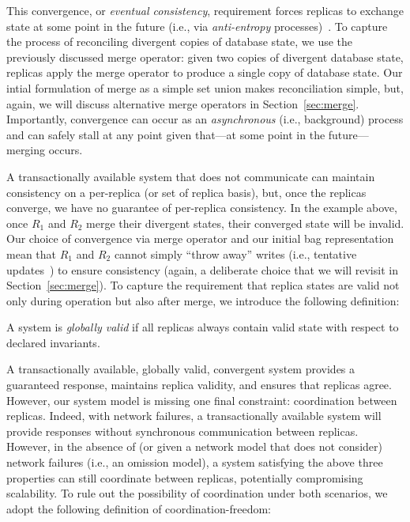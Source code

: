 This convergence, or \textit{eventual consistency}, requirement forces
replicas to exchange state at some point in the future (i.e., via
\textit{anti-entropy} processes)~\cite{vogels-defs}. To capture the
process of reconciling divergent copies of database state, we use the
previously discussed merge operator: given two copies of divergent
database state, replicas apply the merge operator to produce a single
copy of database state. Our intial formulation of merge as a simple
set union makes reconciliation simple, but, again, we will discuss
alternative merge operators in Section~\ref{sec:merge}. Importantly,
convergence can occur as an \textit{asynchronous} (i.e., background)
process and can safely stall at any point given that---at some point
in the future---merging occurs.

 A transactionally available system
that does not communicate can maintain consistency on a per-replica
(or set of replica basis), but, once the replicas converge, we have no
guarantee of per-replica consistency. In the example above, once $R_1$
and $R_2$ merge their divergent states, their converged state will be
invalid. Our choice of convergence via merge operator and our initial
bag representation mean that $R_1$ and $R_2$ cannot simply ``throw
away'' writes (i.e., tentative updates~\cite{tamer-book}) to ensure
consistency (again, a deliberate choice that we will revisit in
Section~\ref{sec:merge}). To capture the requirement that replica
states are valid not only during operation but also after merge, we
introduce the following definition:

\begin{definition}
A system is \textit{globally valid} if all replicas always contain valid
state with respect to declared invariants.
\end{definition}

 A transactionally available, globally valid,
convergent system provides a guaranteed response, maintains replica
validity, and ensures that replicas agree. However, our system model
is missing one final constraint: coordination between
replicas. Indeed, with network failures, a transactionally available
system will provide responses without synchronous communication
between replicas. However, in the absence of (or given a network model
that does not consider) network failures (i.e., an omission model), a
system satisfying the above three properties can still coordinate
between replicas, potentially compromising scalability. To rule out
the possibility of coordination under both scenarios, we adopt the
following definition of coordination-freedom:

